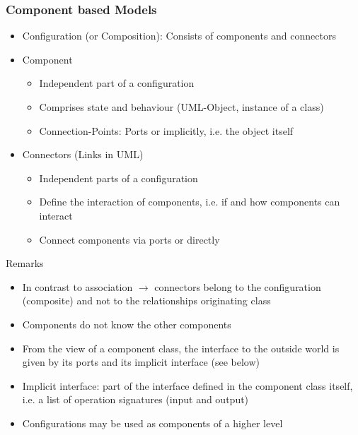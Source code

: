 \begin{paracol}{2}
    \subsubsection{Component based Models}
    \begin{itemize}
        \item Configuration (or Composition): Consists of components and connectors
        \item Component
              \begin{itemize}
                  \item Independent part of a configuration
                  \item Comprises state and behaviour (UML-Object, instance of a class)
                  \item Connection-Points: Ports or implicitly, i.e. the object itself
              \end{itemize}
        \item Connectors (Links in UML)
              \begin{itemize}
                  \item Independent parts of a configuration
                  \item Define the interaction of components, i.e. if and how components can interact
                  \item Connect components via ports or directly
              \end{itemize}
    \end{itemize}
    Remarks
    \begin{itemize}
        \item In contrast to association $\rightarrow$ connectors belong to the configuration (composite) and not to the relationships originating class
        \item Components do not know the other components
        \item From the view of a component class, the interface to the outside world is given by its ports and its implicit interface (see below)
        \item Implicit interface: part of the interface defined in the component class itself, i.e. a list of operation signatures (input and output)
        \item Configurations may be used as components of a higher level
    \end{itemize}

    \switchcolumn


\end{paracol}
